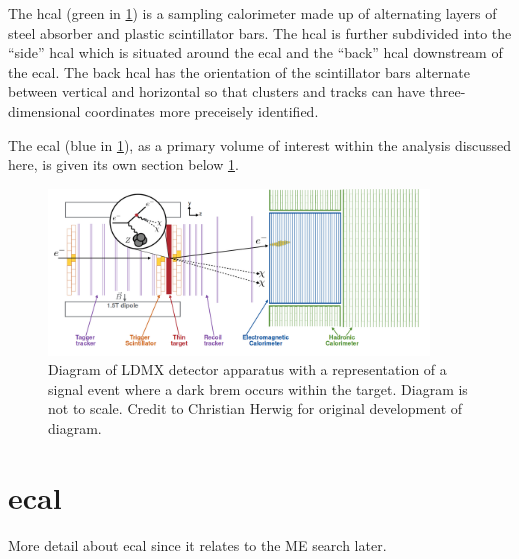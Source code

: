 The \gls{hcal} (green in \cref{fig:ldmx-det}) is a sampling calorimeter made up of alternating layers of steel absorber and
plastic scintillator bars. The \gls{hcal} is further subdivided into the ``side'' \gls{hcal} which
is situated around the \gls{ecal} and the ``back'' \gls{hcal} downstream of the \gls{ecal}. The back \gls{hcal}
has the orientation of the scintillator bars alternate between vertical and horizontal
so that clusters and tracks can have three-dimensional coordinates more preceisely identified.

The \gls{ecal} (blue in \cref{fig:ldmx-det}), as a primary volume of interest within the analysis discussed here, is given its
own section below \cref{sec:ldmx:ecal}.

\begin{figure}
    \centering
    \includegraphics[width=0.9\textwidth]{figures/ldmx/experiment/detector.png}
    \caption{
        Diagram of LDMX detector apparatus with a representation of a signal event where
        a dark brem occurs within the target. Diagram is not to scale. Credit to Christian Herwig
        for original development of diagram.
    }
    \label{fig:ldmx-det}
\end{figure}

\section{\gls{ecal}}
\label{sec:ldmx:ecal}

More detail about \gls{ecal} since it relates to the ME search later.

